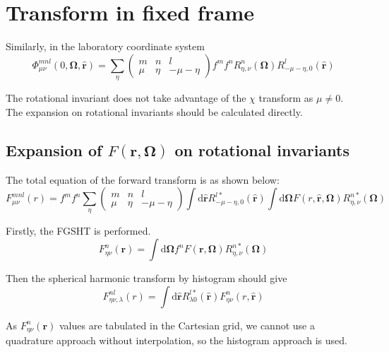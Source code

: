 \section{Transform in fixed frame}

Similarly, in the laboratory coordinate system
\begin{equation}
\Phi_{\mu\nu}^{mnl}(0,\mathbf{\Omega},\mathbf{\hat{r}})=\sum_{\eta}\left(\begin{array}{ccc}
m & n & l\\
\mu & \eta & -\mu-\eta
\end{array}\right)f^{m}f^{n}R_{\eta,\nu}^{n}(\mathbf{\Omega})R_{-\mu-\eta,0}^{l}(\mathbf{\hat{r}})\label{eq:phi_global}
\end{equation}


The rotational invariant does not take advantage of the $\chi$ transform
as $\mu\neq0$. The expansion on rotational invariants should be calculated
directly.


\subsection{Expansion of $F(\mathbf{r},\mathbf{\Omega})$ on rotational invariants}

The total equation of the forward transform is as shown below:
\begin{equation}
F_{\mu\nu}^{mnl}(r)=f^{m}f^{n}\sum_{\eta}\left(\begin{array}{ccc}
m & n & l\\
\mu & \eta & -\mu-\eta
\end{array}\right)\int\mathrm{d}\hat{\mathbf{r}}R_{-\mu-\eta,0}^{l*}(\mathbf{\hat{r}})\int\mathrm{d}\mathbf{\Omega}F(r,\hat{\mathbf{r}},\mathbf{\Omega})R_{\eta,\nu}^{n*}(\mathbf{\Omega})
\end{equation}


Firstly, the FGSHT is performed.
\begin{equation}
F_{\eta\nu}^{n}(\mathbf{r})=\int\mathrm{d}\mathbf{\Omega}f^{n}F(\mathbf{r},\mathbf{\Omega})R_{\eta,\nu}^{n*}(\mathbf{\Omega})
\end{equation}


Then the spherical harmonic transform by histogram should give
\begin{equation}
F_{\eta\nu,\lambda}^{nl}(r)=\int\mathrm{d}\hat{\mathbf{r}}R_{\lambda0}^{l*}(\mathbf{\hat{r}})F_{\eta\nu}^{n}(r,\mathbf{\hat{r}})\label{eq:sht-1}
\end{equation}


As $F_{\eta\nu}^{n}(\mathbf{r})$ values are tabulated in the Cartesian
grid, we cannot use a quadrature approach without interpolation, so
the histogram approach is used.

